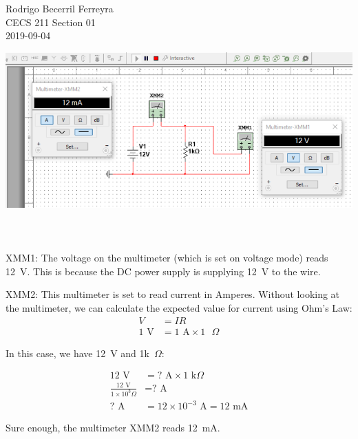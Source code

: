 \documentclass{article}
\begin{document}
\begin{flushright}
    \noindent
    Rodrigo Becerril Ferreyra\\
    CECS 211 Section 01\\
    2019-09-04
\end{flushright}

\includegraphics[width=\textwidth]{Lab1.png}
\\
\\
\\
\\
\indent
XMM1: The voltage on the multimeter (which is set on voltage
mode) reads 12~V.
This is because the DC power supply is supplying 
12~V to the wire.

XMM2: This multimeter is set to read current in Amperes. Without
looking at the multimeter, we can calculate the expected
value for current using Ohm's Law:
\begin{align*}
    V &=IR \\
    1\text{ V} &= 1\text{ A} \times 1\text{ }\Omega
\end{align*}

In this case, we have 12~V and 1k~$\Omega$:

\begin{align*}
    12\text{ V} &= \text{? A} \times 1\text{ k}\Omega \\
    \frac{12\text{ V}}{1 \times 10^3 \Omega} &= \text{? A} \\
    \text {? A} &= 12 \times 10^{-3}\text{ A} = 12\text{ mA}
\end{align*}

Sure enough, the multimeter XMM2 reads 12~mA.
\end{document}
